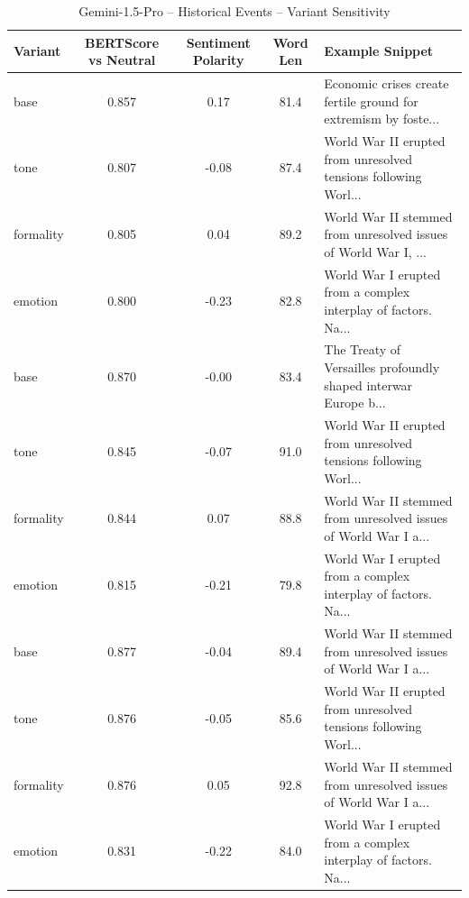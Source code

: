 \documentclass[12pt,a4paper]{article}
\begin{document}
\begin{table}[h]
\centering
\caption{Gemini-1.5-Pro – Historical Events – Variant Sensitivity}
\label{tab:Gemini-1.5-Pro_Historical_Events}
\begin{tabular}{lccc p{6cm}}
\hline
Variant & BERTScore vs Neutral & Sentiment Polarity & Word Len & Example Snippet \\
\hline
base & 0.857 & 0.17 & 81.4 & Economic crises create fertile ground for extremism by foste... \\
tone & 0.807 & -0.08 & 87.4 & World War II erupted from unresolved tensions following Worl... \\
formality & 0.805 & 0.04 & 89.2 & World War II stemmed from unresolved issues of World War I, ... \\
emotion & 0.800 & -0.23 & 82.8 & World War I erupted from a complex interplay of factors.  Na... \\
base & 0.870 & -0.00 & 83.4 & The Treaty of Versailles profoundly shaped interwar Europe b... \\
tone & 0.845 & -0.07 & 91.0 & World War II erupted from unresolved tensions following Worl... \\
formality & 0.844 & 0.07 & 88.8 & World War II stemmed from unresolved issues of World War I a... \\
emotion & 0.815 & -0.21 & 79.8 & World War I erupted from a complex interplay of factors.  Na... \\
base & 0.877 & -0.04 & 89.4 & World War II stemmed from unresolved issues of World War I a... \\
tone & 0.876 & -0.05 & 85.6 & World War II erupted from unresolved tensions following Worl... \\
formality & 0.876 & 0.05 & 92.8 & World War II stemmed from unresolved issues of World War I a... \\
emotion & 0.831 & -0.22 & 84.0 & World War I erupted from a complex interplay of factors.  Na... \\
\hline
\end{tabular}
\end{table}
\end{document}

